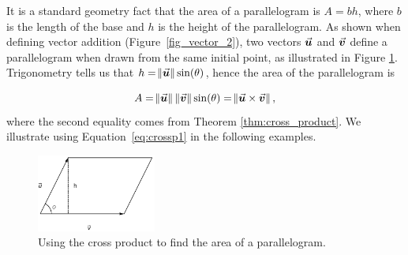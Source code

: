 \ifanalysis


It is a standard geometry fact that the area of a parallelogram is $A = bh$, where $b$ is the length of the base and $h$ is the height of the parallelogram. As shown when defining vector addition (Figure~\ref{fig_vector_2}), two vectors $\vecu$ and $\vecv$ define a parallelogram when drawn from the same initial point, as illustrated in Figure \ref{fig_vector_15}. Trigonometry tells us that $h = \vnorm u \sin (\theta)$, hence the area of the parallelogram is 

\begin{equation}
A = \vnorm u\,\vnorm v\sin(\theta) = \norm{\crossp uv},\label{eq:crossp1}
\end{equation}
where the second equality comes from Theorem \ref{thm:cross_product}. We illustrate using Equation~\eqref{eq:crossp1} in the following examples.

	\begin{figure}[h]
	\begin{center}
			\includegraphics[width=0.35\textwidth]{fig_vector_15}
	\caption{Using the cross product to find the area of a parallelogram.}
	\label{fig_vector_15}
	\end{center}
\end{figure}


